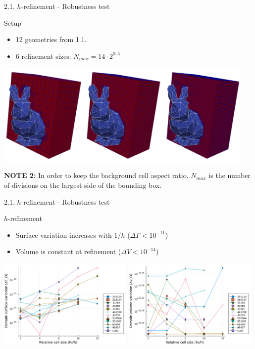 \documentclass{beamer}
\begin{document}
\begin{frame}{2.1. $h$-refinement - Robustness test}
  \begin{block}{Setup}
    \begin{itemize}
      \item
        12 geometries from 1.1.
      \item
        6 refinement sizes: $N_{max} = 14 \cdot 2^{0:5}$
    \end{itemize}
  \end{block}

  \includegraphics[width=0.95\textwidth]{h_low_bunny}

 \textbf{NOTE 2:} In order to keep the background cell aspect ratio, $N_{max}$ is the number of divisions on the largest side of the bounding box.
\end{frame}


\begin{frame}{2.1. $h$-refinement - Robustness test}

  \begin{block}{$h$-refinement}
  \begin{itemize}
    \item
      Surface variation increases with $1/h$ ($\Delta \Gamma < 10^{-11}$)
    \item
      Volume is constant at refinement ($\Delta V < 10^{-14}$)
  \end{itemize}
  \end{block}

  \includegraphics[width=0.49\textwidth]{../analysis/plots/x_nmax_y_domain_surface}
  \includegraphics[width=0.49\textwidth]{../analysis/plots/x_nmax_y_domain_volume}
\end{frame}
\end{document}
